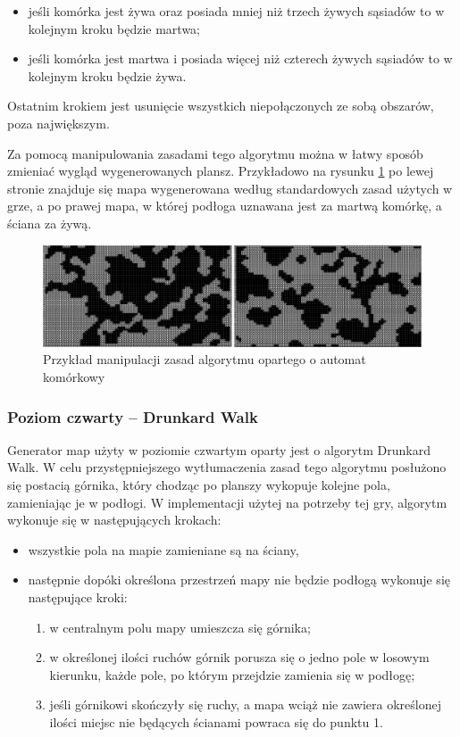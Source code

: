 \documentclass[12pt,twoside]{article}
\begin{document}
\begin{itemize}
	\item jeśli komórka jest żywa oraz posiada mniej niż trzech żywych sąsiadów to w kolejnym kroku będzie martwa;
	\item jeśli komórka jest martwa i posiada więcej niż czterech żywych sąsiadów to w kolejnym kroku będzie żywa.
\end{itemize}

Ostatnim krokiem jest usunięcie wszystkich niepołączonych ze sobą obszarów, poza największym.

Za pomocą manipulowania zasadami tego algorytmu można w łatwy sposób zmieniać wygląd wygenerowanych plansz. Przykładowo na rysunku \ref{generators:ca_diff} po lewej stronie znajduje się mapa wygenerowana według standardowych zasad użytych w grze, a po prawej mapa, w której podłoga uznawana jest za martwą komórkę, a ściana za żywą.

\FloatBarrier
\begin{figure}[h]
	\centering
	\includegraphics[width=16cm]{images/generators/ca_diff.png}
	\caption{Przykład manipulacji zasad algorytmu opartego o automat komórkowy}
	\label{generators:ca_diff}
\end{figure}
\FloatBarrier


\subsubsection{Poziom czwarty -- Drunkard Walk}
Generator map użyty w poziomie czwartym oparty jest o algorytm Drunkard Walk. W celu przystępniejszego wytłumaczenia zasad tego algorytmu posłużono się postacią górnika, który chodząc po planszy wykopuje kolejne pola, zamieniając je w podłogi. W implementacji użytej na potrzeby tej gry, algorytm wykonuje się w następujących krokach:

\begin{itemize}
	\item wszystkie pola na mapie zamieniane są na ściany,
	\item następnie dopóki określona przestrzeń mapy nie będzie podłogą wykonuje się następujące kroki:
	\begin{enumerate}
		\item w centralnym polu mapy umieszcza się górnika;
		\item w określonej ilości ruchów górnik porusza się o jedno pole w losowym kierunku, każde pole, po którym przejdzie zamienia się w podłogę;
		\item jeśli górnikowi skończyły się ruchy, a mapa wciąż nie zawiera określonej ilości miejsc nie będących ścianami powraca się do punktu 1.
	\end{enumerate}	
\end{itemize}
\end{document}
